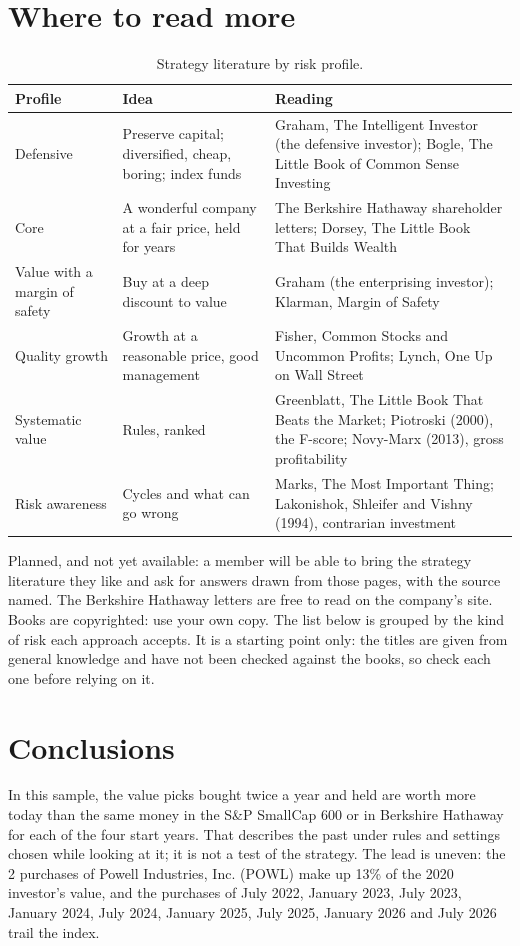 \documentclass[11pt,a4paper]{article}
\begin{document}
\section{Where to read more}
\label{sec:reading}
\begin{table}[H]
\centering
\small
\caption{Strategy literature by risk profile.}\label{tab:reading}
\begin{tabular}{l p{4.5cm} p{5.6cm}}
\hline
Profile & Idea & Reading \\
\hline
Defensive & Preserve capital; diversified, cheap, boring; index funds & Graham, The Intelligent Investor (the defensive investor); Bogle, The Little Book of Common Sense Investing \\
Core & A wonderful company at a fair price, held for years & The Berkshire Hathaway shareholder letters; Dorsey, The Little Book That Builds Wealth \\
Value with a margin of safety & Buy at a deep discount to value & Graham (the enterprising investor); Klarman, Margin of Safety \\
Quality growth & Growth at a reasonable price, good management & Fisher, Common Stocks and Uncommon Profits; Lynch, One Up on Wall Street \\
Systematic value & Rules, ranked & Greenblatt, The Little Book That Beats the Market; Piotroski (2000), the F-score; Novy-Marx (2013), gross profitability \\
Risk awareness & Cycles and what can go wrong & Marks, The Most Important Thing; Lakonishok, Shleifer and Vishny (1994), contrarian investment \\
\hline
\end{tabular}
\end{table}
Planned, and not yet available: a member will be able to bring the strategy literature they like and ask for answers drawn from those pages, with the source named. The Berkshire Hathaway letters are free to read on the company's site. Books are copyrighted: use your own copy. The list below is grouped by the kind of risk each approach accepts. It is a starting point only: the titles are given from general knowledge and have not been checked against the books, so check each one before relying on it.

\section{Conclusions}
In this sample, the value picks bought twice a year and held are worth more today than the same money in the S\&P SmallCap 600 or in Berkshire Hathaway for each of the four start years. That describes the past under rules and settings chosen while looking at it; it is not a test of the strategy. The lead is uneven: the 2 purchases of Powell Industries, Inc. (POWL) make up 13\% of the 2020 investor's value, and the purchases of July 2022, January 2023, July 2023, January 2024, July 2024, January 2025, July 2025, January 2026 and July 2026 trail the index.
\end{document}

